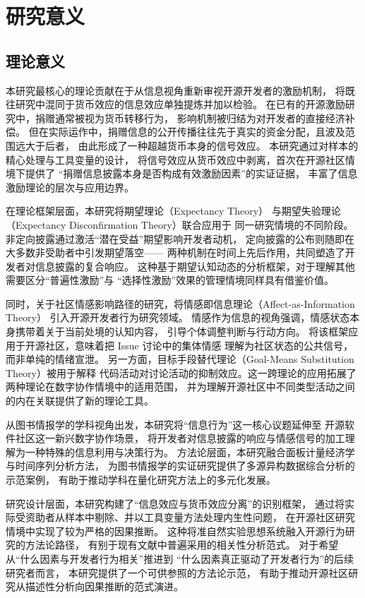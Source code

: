 \documentclass[
    type = master, %
    degree = professional,        %
    decl-page,  %
    twoside,                %
    fontset = fandol %
  ]{njuthesis}
\begin{document}
\section{研究意义}

\subsection{理论意义}

本研究最核心的理论贡献在于从信息视角重新审视开源开发者的激励机制，
将既往研究中混同于货币效应的信息效应单独提炼并加以检验。
在已有的开源激励研究中，捐赠通常被视为货币转移行为，
影响机制被归结为对开发者的直接经济补偿\cite{zhang2022who,wang2022influence}。
但在实际运作中，捐赠信息的公开传播往往先于真实的资金分配，且波及范围远大于后者，
由此形成了一种超越货币本身的信号效应。
本研究通过对样本的精心处理与工具变量的设计，
将信号效应从货币效应中剥离，首次在开源社区情境下提供了
“捐赠信息披露本身是否构成有效激励因素”的实证证据，
丰富了信息激励理论的层次与应用边界。

在理论框架层面，本研究将期望理论（Expectancy Theory）
与期望失验理论（Expectancy Disconfirmation Theory）联合应用于
同一研究情境的不同阶段。非定向披露通过激活“潜在受益”期望影响开发者动机，
定向披露的公布则随即在大多数非受助者中引发期望落空——
两种机制在时间上先后作用，共同塑造了开发者对信息披露的复合响应。
这种基于期望认知动态的分析框架，对于理解其他需要区分“普遍性激励”与
“选择性激励”效果的管理情境同样具有借鉴价值。

同时，关于社区情感影响路径的研究，将情感即信息理论（Affect-as-Information Theory）
引入开源开发者行为研究领域。
情感作为信息的视角强调，情感状态本身携带着关于当前处境的认知内容，
引导个体调整判断与行动方向\cite{schwarz1983moods}。
将该框架应用于开源社区，意味着把 Issue 讨论中的集体情感
理解为社区状态的公共信号，而非单纯的情绪宣泄。
另一方面，目标手段替代理论（Goal-Means Substitution Theory）被用于解释
代码活动对讨论活动的抑制效应。这一跨理论的应用拓展了两种理论在数字协作情境中的适用范围，
并为理解开源社区中不同类型活动之间的内在关联提供了新的理论工具。

从图书情报学的学科视角出发，本研究将“信息行为”这一核心议题延伸至
开源软件社区这一新兴数字协作场景，
将开发者对信息披露的响应与情感信号的加工理解为一种特殊的信息利用与决策行为。
方法论层面，本研究融合面板计量经济学与时间序列分析方法，
为图书情报学的实证研究提供了多源异构数据综合分析的示范案例，
有助于推动学科在量化研究方法上的多元化发展。

研究设计层面，本研究构建了“信息效应与货币效应分离”的识别框架，
通过将实际受资助者从样本中剔除、并以工具变量方法处理内生性问题，
在开源社区研究情境中实现了较为严格的因果推断。
这种将准自然实验思想系统融入开源行为研究的方法论路径，
有别于现有文献中普遍采用的相关性分析范式。
对于希望从“什么因素与开发者行为相关”推进到
“什么因素真正驱动了开发者行为”的后续研究者而言，
本研究提供了一个可供参照的方法论示范，
有助于推动开源社区研究从描述性分析向因果推断的范式演进。
\end{document}
